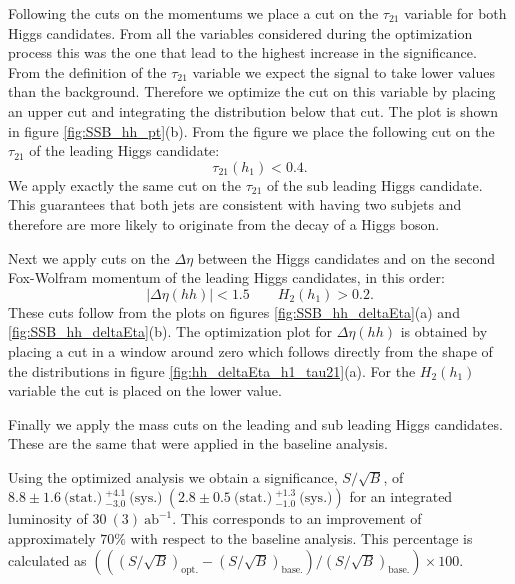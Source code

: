 Following the cuts on the momentums we place a cut on the $\tau_{21}$ variable for both Higgs candidates. From all the variables considered during the optimization process this was the one that lead to the highest increase in the significance. From the definition of the $\tau_{21}$ variable we expect the signal to take lower values than the background. Therefore we optimize the cut on this variable by placing an upper cut and integrating the distribution below that cut. The plot is shown in figure \ref{fig:SSB_hh_pt}(b). From the figure we place the following cut on the $\tau_{21}$ of the leading Higgs candidate:
\begin{equation}
	\tau_{21}(h_1)<0.4.
\end{equation}
We apply exactly the same cut on the $\tau_{21}$ of the sub leading Higgs candidate. This guarantees that both jets are consistent with having two subjets and therefore are more likely to originate from the decay of a Higgs boson.

Next we apply cuts on the $\Delta\eta$ between the Higgs candidates and on the second Fox-Wolfram momentum of the leading Higgs candidates, in this order:
\begin{equation}
	|\Delta\eta(hh)|<1.5 \qquad H_2(h_1)>0.2.
\end{equation} 
These cuts follow from the plots on figures \ref{fig:SSB_hh_deltaEta}(a) and \ref{fig:SSB_hh_deltaEta}(b). The optimization plot for $\Delta\eta(hh)$ is obtained by placing a cut in a window around zero which follows directly from the shape of the distributions in figure \ref{fig:hh_deltaEta_h1_tau21}(a). For the $H_2(h_1)$ variable the cut is placed on the lower value.

Finally we apply the mass cuts on the leading and sub leading Higgs candidates. These are the same that were applied in the baseline analysis.

Using the optimized analysis we obtain a significance, $S/\sqrt{B}$, of $8.8\pm 1.6~\text{(stat.)}~^{+4.1}_{-3.0}~\text{(sys.)}~(2.8\pm 0.5~\text{(stat.)}~^{+1.3}_{-1.0}~\text{(sys.)})$ for an integrated luminosity of $30~(3)~\text{ab}^{-1}$. This corresponds to an improvement of approximately $70\%$ with respect to the baseline analysis. This percentage is calculated as $\left(((S/\sqrt{B})_{\text{opt.}}-(S/\sqrt{B})_{\text{base.}})/(S/\sqrt{B})_{\text{base.}}\right)\times 100$.

